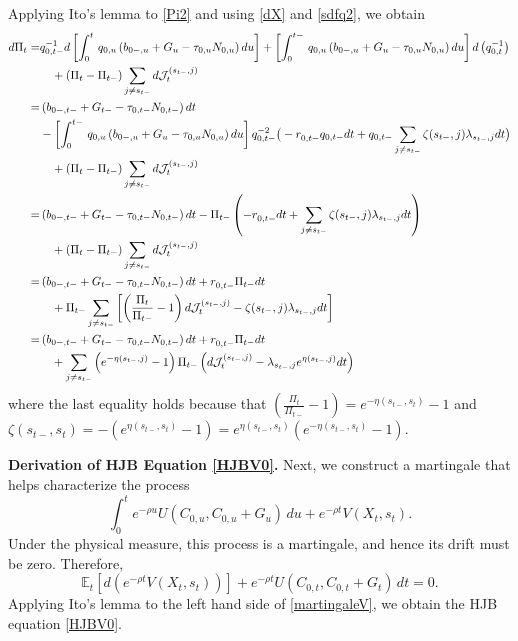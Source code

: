 \documentclass[12pt]{article}
\begin{document}
Applying Ito's lemma to \eqref{Pi2} and using \eqref{dX} and \eqref{sdfq2}, we obtain
\begin{align}
d\Pi_t  = &  q_{0, t-}^{-1} d \left[ \int_{0}^t\, {q_{0, u}} \left(b_{0-, u} +G_u-\tau_{0, u} N_{0, u} \right)du \right] +   \left[\int_{0}^{t-}\, {q_{0, u}} \left(b_{0-, u} +G_u-\tau_{0, u} N_{0, u} \right)du \right] d\left( q_{0, t}^{-1}\right)   \notag\\
 & \quad  + (\Pi_t - \Pi_{t-}) \sum_{j\neq s_{t-}} d {\mathcal J}_t^{(s_{t-}, j)}  \notag\\
 = & \left(b_{0-, t-} +G_{t-}-\tau_{0, t-} N_{0, t-} \right)dt    \notag \\
& -  \left[\int_{0}^{t-}\, {q_{0, u}} \left(b_{0-, u} +G_u-\tau_{0, u} N_{0, u} \right)du \right] q_{0, t-}^{-2} \big(- r^{}_{0, t-} q_{0, t-}dt  +  q_{0, t-}  \sum_{j\neq s_{t-}} \zeta(s_{t-}, j) \lambda_{s_{t-}, j} d t \big) \notag\\
&   \quad  + (\Pi_t - \Pi_{t-}) \sum_{j\neq s_{t-}} d {\mathcal J}_t^{(s_{t-}, j)}  \notag\\
=&   \left(b_{0-, t-} +G_{t-}-\tau_{0, t-} N_{0, t-} \right)dt  - \Pi_{t-} \left(- r^{}_{0, t-} dt  +    \sum_{j\neq s_{t-}} \zeta(s_{t-}, j) \lambda_{s_{t-}, j} d t  \right)  \notag \\
 & \quad  + (\Pi_t - \Pi_{t-}) \sum_{j\neq s_{t-}} d {\mathcal J}_t^{(s_{t-}, j)}  \notag\\
 = & \left(b_{0-, t-} +G_{t-}-\tau_{0, t-} N_{0, t-} \right)dt + r^{}_{0, t-}\Pi_{t-}dt \notag\\
 & \quad + \Pi_{t-} \sum_{j\neq s_{t-}} \left[ \left( \frac{\Pi_{t}}{\Pi_{t-}}-1  \right) d {\mathcal J}_t^{(s_{t-}, j)} -\zeta(s_{t-}, j) \lambda_{s_{t-}, j} d t   \right]  \notag \\
 =&\left(b_{0-, t-} +G_{t-}-\tau_{0, t-} N_{0, t-} \right)dt + r^{}_{0, t-}\Pi_{t-}dt  \notag \\
 &\quad   +    \sum_{j\neq s_{t-}} \left(e^{-\eta(s_{t-}, j)}-1 \right)\Pi_{t-} \left(d {\mathcal J}_t^{(s_{t-}, j)} - \lambda_{s_{t-}, j}e^{\eta(s_{t-}, j)} d t \right)
\end{align}
where the last equality holds because that $\left( \frac{\Pi_{t}}{\Pi_{t-}}-1  \right) = e^{-\eta(s_{t-}, s_t)}-1$ and $\zeta(s_{t-}, s_t)= -\left(e^{\eta(s_{t-}, s_t)}-1\right) =  e^{\eta(s_{t-}, s_t)} \left(e^{-\eta(s_{t-}, s_t)}-1\right) $.

\bigskip
\noindent\textbf{Derivation of HJB Equation \eqref{HJBV0}.}\quad 
Next, we construct a martingale that helps characterize the process
\begin{equation*}
    \int_0^t e^{-\rho u} U(C_{0,u}, C_{0,u}+G_u)\, du
    + e^{-\rho t} V(X_t, s_t).
\end{equation*}
Under the physical measure, this process is a martingale, and hence its drift must be zero. Therefore,
\begin{equation} \label{martingaleV}
    \mathbb{E}_t\left[d\left(e^{-\rho t}V(X_t, s_t)\right)\right]
    + e^{-\rho t} U(C_{0,t}, C_{0,t}+G_t)\,dt = 0.
\end{equation}
Applying Ito's lemma to the left hand side of \eqref{martingaleV}, we obtain the HJB equation \eqref{HJBV0}.
\end{document}
